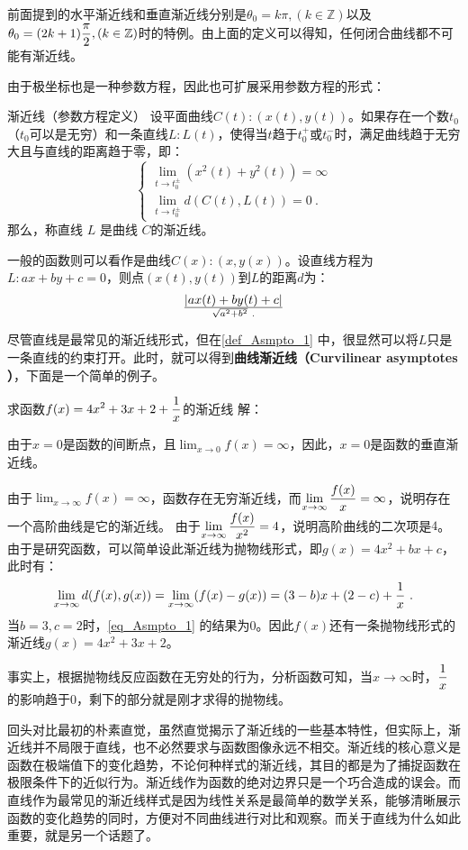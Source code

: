 前面提到的水平渐近线和垂直渐近线分别是$\theta_0=k\pi,(k\in\mathbb{Z})$以及$\displaystyle\theta_0=(2k+1){\pi\over2},(k\in\mathbb{Z})$时的特例。由上面的定义可以得知，任何闭合曲线都不可能有渐近线。

由于极坐标也是一种参数方程，因此也可扩展采用参数方程的形式：

\begin{definition}{渐近线（参数方程定义）}\label{def_Asmpto_1}
设平面曲线$C(t):\left(x(t),y(t)\right)$。如果存在一个数$t_0$（$t_0$可以是无穷）和一条直线$L:L(t)$，使得当$t$趋于$t_0^+$或$t_0^-$时，满足曲线趋于无穷大且与直线的距离趋于零，即：
\begin{equation}
\begin{cases}
\displaystyle\lim_{t \to t^\pm_0} \left(x^2(t)+y^2(t)\right) = \infty\\
\displaystyle\lim_{t \to t^\pm_0} d(C(t), L(t)) = 0~.
\end{cases}
\end{equation}
那么，称直线  $L$  是曲线  $C$的渐近线。
\end{definition}

一般的函数则可以看作是曲线$C(x):\left(x,y(x)\right)$。设直线方程为$L:ax+by+c=0$，则点$\left(x(t),y(t)\right)$到$L$的距离$d$为：
\begin{equation}
|ax(t)+by(t)+c|\over\sqrt{a^2+b^2}~.
\end{equation}

尽管直线是最常见的渐近线形式，但在\autoref{def_Asmpto_1} 中，很显然可以将$L$只是一条直线的约束打开。此时，就可以得到\textbf{曲线渐近线（Curvilinear asymptotes ）}，下面是一个简单的例子。

\begin{example}{求函数$\displaystyle f(x)=4x^2+3x+2+{1\over x}$的渐近线}
解：

由于$x=0$是函数的间断点，且$\displaystyle\lim_{x\to0}f(x)=\infty$，因此，$x=0$是函数的垂直渐近线。

由于$\displaystyle\lim_{x\to\infty}f(x)=\infty$，函数存在无穷渐近线，而$\displaystyle\lim_{x\to\infty}{f(x)\over x}=\infty$，说明存在一个高阶曲线是它的渐近线。
由于$\displaystyle\lim_{x\to\infty}{f(x)\over x^2}=4$，说明高阶曲线的二次项是$4$。由于是研究函数，可以简单设此渐近线为抛物线形式，即$g(x)=4x^2+bx+c$，此时有：
\begin{equation}\label{eq_Asmpto_1}
\displaystyle\lim_{x \to \infty} d(f(x), g(x)) =\displaystyle\lim_{x \to \infty} (f(x)-g(x))=(3-b)x+(2-c)+{1\over x}~.
\end{equation}
当$b=3,c=2$时，\autoref{eq_Asmpto_1} 的结果为$0$。因此$f(x)$还有一条抛物线形式的渐近线$g(x)=4x^2+3x+2$。

事实上，根据抛物线反应函数在无穷处的行为，分析函数可知，当$x\to\infty$时，$\displaystyle{1\over x}$的影响趋于$0$，剩下的部分就是刚才求得的抛物线。
\end{example}

回头对比最初的朴素直觉，虽然直觉揭示了渐近线的一些基本特性，但实际上，渐近线并不局限于直线，也不必然要求与函数图像永远不相交。渐近线的核心意义是函数在极端值下的变化趋势，不论何种样式的渐近线，其目的都是为了捕捉函数在极限条件下的近似行为。渐近线作为函数的绝对边界只是一个巧合造成的误会。而直线作为最常见的渐近线样式是因为线性关系是最简单的数学关系，能够清晰展示函数的变化趋势的同时，方便对不同曲线进行对比和观察。而关于直线为什么如此重要，就是另一个话题了。